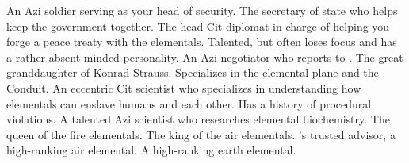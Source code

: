 \documentclass[char]{elementals}
\begin{document}
\begin{contacts}
  \contact{\cRomeo{}} An Azi soldier serving as your head of security.
  \contact{\cDema{}} The secretary of state who helps keep the government together.
	\contact{\cAvatar{}} The head Cit diplomat in charge of helping you forge a peace treaty with the elementals. Talented, but often loses focus and has a rather absent-minded personality.
	\contact{\cDiplomat{}} An Azi negotiator who reports to \cAvatar{}.
	\contact{\cGD{}} The great granddaughter of Konrad Strauss. Specializes in the elemental plane and the Conduit.
	\contact{\cMS{}} An eccentric Cit scientist who specializes in understanding how elementals can enslave humans and each other. Has a history of procedural violations.
	\contact{\cScientist{}} A talented Azi scientist who researches elemental biochemistry.
	\contact{\cQueen{}} The queen of the fire elementals.
	\contact{\cKing{}} The king of the air elementals.
	\contact{\cNaturalist{}} \cKing{}'s trusted advisor, a high-ranking air elemental.
	\contact{\cLoyal{}} A high-ranking earth elemental.
\end{contacts}
\end{document}
